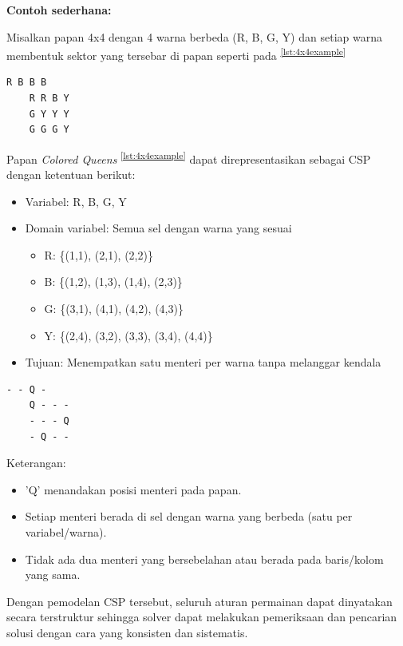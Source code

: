 \documentclass[a4paper,twoside]{article}
\begin{document}
	\textbf{Contoh sederhana:}  
	
	Misalkan papan 4x4 dengan 4 warna berbeda (R, B, G, Y) dan setiap warna membentuk sektor yang tersebar di papan seperti pada \textsuperscript{\ref{lst:4x4example}}
	
	\begin{lstlisting}[caption={papan 4x4 dengan 4 warna berbeda (R, B, G, Y)}, label={lst:4x4example}, basicstyle=\ttfamily, frame=single]
	R B B B
	R R B Y
	G Y Y Y
	G G G Y
	\end{lstlisting}
	
	Papan \textit{Colored Queens} \textsuperscript{\ref{lst:4x4example}} dapat direpresentasikan sebagai CSP dengan ketentuan berikut:
	\begin{itemize}
	\item Variabel: R, B, G, Y
	\item Domain variabel: Semua sel dengan warna yang sesuai
	\begin{itemize}
		\item R: \{(1,1), (2,1), (2,2)\}
		\item B: \{(1,2), (1,3), (1,4), (2,3)\}
		\item G: \{(3,1), (4,1), (4,2), (4,3)\}
		\item Y: \{(2,4), (3,2), (3,3), (3,4), (4,4)\}
	\end{itemize}
	\item Tujuan: Menempatkan satu menteri per warna tanpa melanggar kendala
	\end{itemize}
	
	
	\begin{lstlisting}[caption={Contoh solusi valid dari papan di listing {\ref{lst:4x4example}}}, basicstyle=\ttfamily, frame=single]
	- - Q -
	Q - - -
	- - - Q
	- Q - -
	\end{lstlisting}
	
	Keterangan:
	\begin{itemize}
	\item 'Q' menandakan posisi menteri pada papan.
	\item Setiap menteri berada di sel dengan warna yang berbeda (satu per variabel/warna).
	\item Tidak ada dua menteri yang bersebelahan atau berada pada baris/kolom yang sama.
	\end{itemize}
	
	Dengan pemodelan CSP tersebut, seluruh aturan permainan dapat dinyatakan secara terstruktur sehingga solver dapat melakukan pemeriksaan dan pencarian solusi dengan cara yang konsisten dan sistematis.
	
\end{document}
